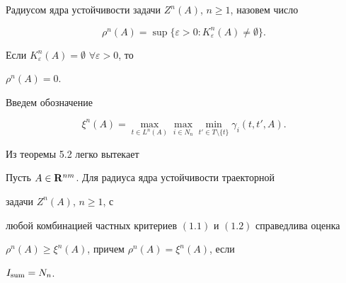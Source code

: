 

 


Радиусом ядра устойчивости задачи $Z^n(A)$, $n\ge 1$, назовем число 


$$ 


\rho^n(A)=\sup\{\varepsilon>0:K^n_\varepsilon(A)\ne\emptyset\}. 


$$ 


Если $K^n_\varepsilon(A)=\emptyset$ $\forall\varepsilon>0$, то 


$\rho^n(A)=0$. 


 


Введем обозначение 


$$ 


\xi^n(A)=\max_{t\in L^n(A)}\max_{i\in N_n} 


\min_{t'\in T\setminus\{t\}}\gamma_i(t,t',A). 


$$ 


 


Из теоремы 5.2 легко вытекает 


 


\begin{thms} 


Пусть $A\in\bold R^{nm}$. Для радиуса ядра устойчивости траекторной 


задачи $Z^n(A)$, $n\ge 1$, с 


любой комбинацией частных критериев $(1.1)$ и $(1.2)$ справедлива оценка 


$\rho^n(A)\ge\xi^n(A)$, причем $\rho^n(A)=\xi^n(A)$, если 


$I_{\operatorname{sum}}=N_n$. 


\end{thms} 


